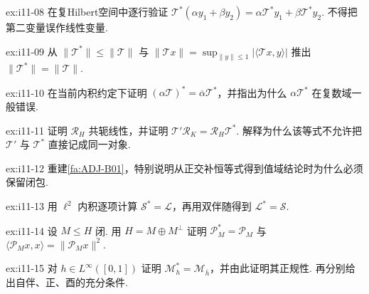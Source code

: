 \begin{FAExercise}[第一变量线性专项]{ex:i11-08}
在复Hilbert空间中逐行验证 \(\displaystyle \mathcal T^*(\alpha y_1+\beta y_2)=\alpha\mathcal T^*y_1+\beta\mathcal T^*y_2\). 不得把第二变量误作线性变量.
\end{FAExercise}

\begin{FAExercise}[伴随范数等式]{ex:i11-09}
从 \(\displaystyle \|\mathcal T^*\|\leqslant\|\mathcal T\|\) 与 \(\displaystyle \|\mathcal T x\|=\sup_{\|y\|\leqslant1}|\langle\mathcal T x,y\rangle|\) 推出 \(\displaystyle \|\mathcal T^*\|=\|\mathcal T\|\).
\end{FAExercise}

\begin{FAExercise}[标量共轭]{ex:i11-10}
在当前内积约定下证明 \(\displaystyle (\alpha\mathcal T)^*=\overline\alpha\mathcal T^*\)，并指出为什么 \(\displaystyle \alpha\mathcal T^*\) 在复数域一般错误.
\end{FAExercise}

\begin{FAExercise}[Riesz桥梁]{ex:i11-11}
证明 \(\displaystyle \mathcal R_H\) 共轭线性，并证明 \(\displaystyle \mathcal T'\mathcal R_K=\mathcal R_H\mathcal T^*\). 解释为什么该等式不允许把 \(\displaystyle \mathcal T'\) 与 \(\displaystyle \mathcal T^*\) 直接记成同一对象.
\end{FAExercise}

\begin{FAExercise}[核与值域正交]{ex:i11-12}
重建\autoref{fa:ADJ-B01}，特别说明从正交补恒等式得到值域结论时为什么必须保留闭包.
\end{FAExercise}

\begin{FAExercise}[移位伴随]{ex:i11-13}
用 \(\displaystyle \ell^2\) 内积逐项计算 \(\displaystyle \mathcal S^*=\mathcal L\)，再用双伴随得到 \(\displaystyle \mathcal L^*=\mathcal S\).
\end{FAExercise}

\begin{FAExercise}[正交投影]{ex:i11-14}
设 \(\displaystyle M\leqslant H\) 闭. 用 \(\displaystyle H=M\oplus M^\perp\) 证明 \(\displaystyle \mathcal P_M^*=\mathcal P_M\) 与 \(\displaystyle \langle\mathcal P_Mx,x\rangle=\|\mathcal P_Mx\|^2\).
\end{FAExercise}

\begin{FAExercise}[乘法算子的伴随]{ex:i11-15}
对 \(\displaystyle h\in L^\infty([0,1])\) 证明 \(\displaystyle \mathcal M_h^*=\mathcal M_{\overline h}\)，并由此证明其正规性. 再分别给出自伴、正、酉的充分条件.
\end{FAExercise}

